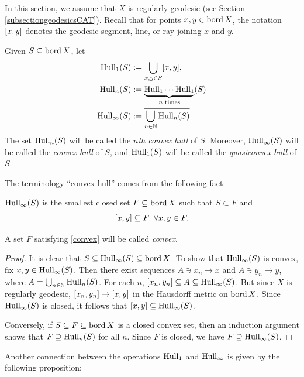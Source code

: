 In this section, we assume that $X$ is regularly geodesic (see Section \ref{subsectiongeodesicsCAT}). Recall that for points $x,y\in\operatorname{bord} X$, the notation $[x,y]$ denotes the geodesic segment, line, or ray joining $x$ and $y$.

\begin{definition}
\label{definitionconvexhull}
Given $S\subseteq\operatorname{bord} X$, let
\begin{align*}
\Hull_1(S) &:= \bigcup_{x,y\in S} \geo xy,\\
\Hull_n(S) &:= \underbrace{\Hull_1\cdots \Hull_1}_{\text{$n$ times}}(S)\\
\Hull_\infty(S) &:= \cl{\bigcup_{n\in\N}\Hull_n(S)}.
\end{align*}
The set $\operatorname{Hull}_n(S)$ will be called the \emph{$n$th convex hull} of $S$. Moreover, $\operatorname{Hull}_\infty(S)$ will be called the \emph{convex hull} of $S$, and $\operatorname{Hull}_1(S)$ will be called the \emph{quasiconvex hull} of $S$.
\end{definition}

The terminology ``convex hull'' comes from the following fact:

\begin{proposition}
\label{propositionconvexhull}
$\operatorname{Hull}_\infty(S)$ is the smallest closed set $F\subseteq \operatorname{bord} X$ such that $S\subset F$ and
\begin{equation}
\label{convex}
[x,y]\subseteq F \;\;\forall x,y\in F.
\end{equation}
\end{proposition}
A set $F$ satisfying \eqref{convex} will be called \emph{convex}.
\begin{proof}
It is clear that $S\subseteq\operatorname{Hull}_\infty(S)\subseteq\operatorname{bord} X$. To show that $\operatorname{Hull}_\infty(S)$ is convex, fix $x,y\in\operatorname{Hull}_\infty(S)$. Then there exist sequences $A\ni x_n\to x$ and $A\ni y_n\to y$, where $A = \bigcup_{n\in\N}\Hull_n(S)$. For each $n$, $[x_n,y_n]\subseteq A\subseteq \operatorname{Hull}_\infty(S)$. But since $X$ is regularly geodesic, $[x_n,y_n]\to [x,y]$ in the Hausdorff metric on $\operatorname{bord} X$. Since $\operatorname{Hull}_\infty(S)$ is closed, it follows that $[x,y]\subseteq\operatorname{Hull}_\infty(S)$.

Conversely, if $S\subseteq F\subseteq \operatorname{bord} X$ is a closed convex set, then an induction argument shows that $F\supseteq \operatorname{Hull}_n(S)$ for all $n$. Since $F$ is closed, we have $F\supseteq \operatorname{Hull}_\infty(S)$.
\end{proof}

Another connection between the operations $\operatorname{Hull}_1$ and $\operatorname{Hull}_\infty$ is given by the following proposition:


